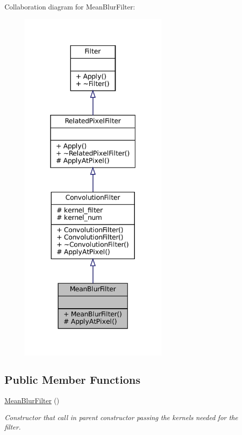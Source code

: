 Collaboration diagram for Mean\+Blur\+Filter\+:\nopagebreak
\begin{figure}[H]
\begin{center}
\leavevmode
\includegraphics[width=208pt]{classMeanBlurFilter__coll__graph}
\end{center}
\end{figure}
\subsection*{Public Member Functions}
\begin{DoxyCompactItemize}
\item 
\mbox{\label{classMeanBlurFilter_a506584ed32d9343588264ec8e1ba3a83}} 
\hyperlink{classMeanBlurFilter_a506584ed32d9343588264ec8e1ba3a83}{Mean\+Blur\+Filter} ()
\begin{DoxyCompactList}\small\item\em Constructor that call in parent constructor passing the kernels needed for the filter. \end{DoxyCompactList}\end{DoxyCompactItemize}
